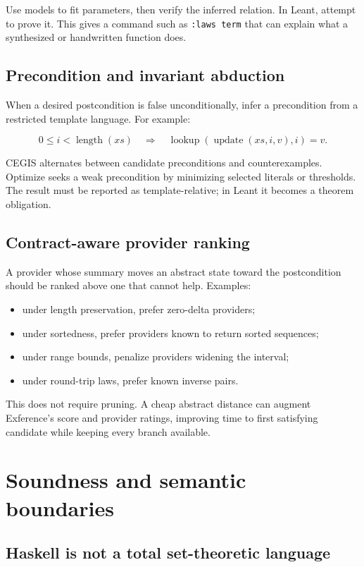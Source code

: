 \documentclass[11pt,oneside]{article}
\newcommand{\code}[1]{\texttt{#1}}
\begin{document}
Use models to fit parameters, then verify the inferred relation. In Leant, attempt to
prove it. This gives a command such as \code{:laws term} that can explain what a
synthesized or handwritten function does.

\subsection{Precondition and invariant abduction}

When a desired postcondition is false unconditionally, infer a precondition from a
restricted template language. For example:

\[
  0\leq i < \operatorname{length}(xs)
  \quad\Rightarrow\quad
  \operatorname{lookup}(\operatorname{update}(xs,i,v),i)=v.
\]

CEGIS alternates between candidate preconditions and counterexamples. Optimize seeks a
weak precondition by minimizing selected literals or thresholds. The result must be
reported as template-relative; in Leant it becomes a theorem obligation.

\subsection{Contract-aware provider ranking}

A provider whose summary moves an abstract state toward the postcondition should be
ranked above one that cannot help. Examples:

\begin{itemize}
  \item under length preservation, prefer zero-delta providers;
  \item under sortedness, prefer providers known to return sorted sequences;
  \item under range bounds, penalize providers widening the interval;
  \item under round-trip laws, prefer known inverse pairs.
\end{itemize}

This does not require pruning. A cheap abstract distance can augment Exference's score
and provider ratings, improving time to first satisfying candidate while keeping every
branch available.

\section{Soundness and semantic boundaries}

\subsection{Haskell is not a total set-theoretic language}
\end{document}
